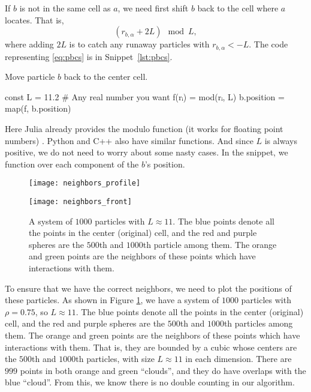If $b$ is not in the same cell as $a$, we need first shift $b$ back to the cell where
$a$ locates. That is,
%
\begin{equation}\label{eq:pbcs}
    (r_{b, \alpha} + 2L) \mod L,
\end{equation}
%
where adding $2L$ is to catch any runaway particles with $r_{b, \alpha} < -L$.
The code representing \eqref{eq:pbcs} is in Snippet~\ref{lst:pbcs}.
%
\begin{algorithm}
    \caption{Move particle $b$ back to the center cell.}
    \label{lst:pbcs}
    \begin{juliacode}
        const L = 11.2  # Any real number you want
        f(rᵢ) = mod(rᵢ, L)
        b.position = map(f, b.position)
    \end{juliacode}
\end{algorithm}
%
Here Julia already provides the modulo function (it works for floating point numbers)
\href{https://docs.julialang.org/en/v1/base/math/#Base.mod}{}. Python and C++
also have similar functions. And since $L$ is always positive, we do not need to worry
about some nasty cases.
In the snippet, we  function  over
each component of the $b$'s position.

\begin{figure} %
    \centering
    \begin{minipage}[t]{0.5\linewidth}
        \centering
        \texttt{[image: neighbors\_profile]}
        \label{fig:neighbors:a}
    \end{minipage}
    \hfill
    \begin{minipage}[t]{0.5\linewidth}
        \centering
        \texttt{[image: neighbors\_front]}
        \label{fig:neighbors:b}
    \end{minipage}
    \caption{A system of $1000$ particles with $L \approx 11$. The blue points denote all
        the points in the center (original) cell, and the red and purple spheres are the
        $500$th and $1000$th particle among them. The orange and green points are the
        neighbors of these points which have interactions with them.}
    \label{fig:neighbors}
\end{figure}

To ensure that we have the correct neighbors, we need to plot the positions of these particles.
As shown in Figure \ref{fig:neighbors}, we have a system of $1000$ particles with
$\rho = 0.75$, so $L \approx 11$. The blue points denote all
the points in the center (original) cell, and the red and purple spheres are the
$500$th and $1000$th particles among them. The orange and green points are the
neighbors of these points which have interactions with them. That is, they are bounded by a
cubic whose centers are the $500$th and $1000$th particles,
with size $L \approx 11$ in each dimension.
There are $999$ points in both orange and green ``clouds'', and they do have overlaps
with the blue ``cloud''. From this, we know there is no double counting in our algorithm.

